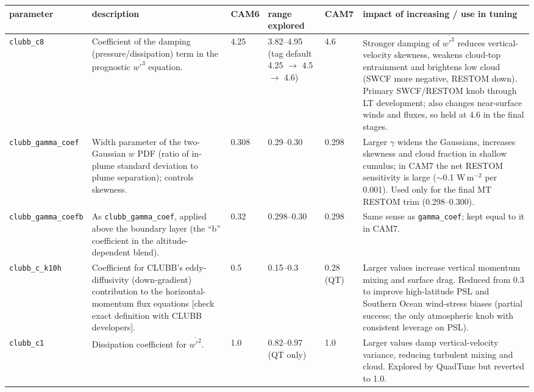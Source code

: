 \documentclass[draft]{agujournal2019}
\begin{document}
\scriptsize
 \begin{tabular}{p{2.3cm} p{3.1cm} p{0.9cm} p{1.8cm} p{1.0cm} p{4.2cm}}
  \hline
 parameter & description & CAM6 & range explored & CAM7 & impact of increasing / use in tuning \\
 \hline  \hline
\texttt{clubb\_\allowbreak c8} &
Coefficient of the damping (pressure/dissipation) term in the prognostic
$\overline{w'^3}$ equation. &
4.25 & 3.82--4.95 (tag default 4.25 $\to$ 4.5 $\to$ 4.6) & 4.6 &
Stronger damping of $\overline{w'^3}$ reduces vertical-velocity skewness,
weakens cloud-top entrainment and brightens low cloud (SWCF more negative,
RESTOM down). Primary SWCF/RESTOM knob through LT development; also changes
near-surface winds and fluxes, so held at 4.6 in the final stages. \\

\texttt{clubb\_\allowbreak gamma\_\allowbreak coef} &
Width parameter of the two-Gaussian $w$ PDF (ratio of in-plume standard
deviation to plume separation); controls skewness. &
0.308 & 0.29--0.30 & 0.298 &
Larger $\gamma$ widens the Gaussians, increases skewness and cloud fraction in
shallow cumulus; in CAM7 the net RESTOM sensitivity is large
($\sim$0.1 W\,m$^{-2}$ per 0.001). Used only for the final MT RESTOM trim
(0.298--0.300). \\

\texttt{clubb\_\allowbreak gamma\_\allowbreak coefb} &
As \texttt{clubb\_gamma\_coef}, applied above the boundary layer (the ``b''
coefficient in the altitude-dependent blend). &
0.32 & 0.298--0.30 & 0.298 &
Same sense as \texttt{gamma\_coef}; kept equal to it in CAM7. \\

\texttt{clubb\_\allowbreak c\_\allowbreak k10h} &
Coefficient for CLUBB's eddy-diffusivity (down-gradient) contribution to the
horizontal-momentum flux equations [check exact definition with CLUBB
developers]. &
0.5 & 0.15--0.3 & 0.28 (QT) &
Larger values increase vertical momentum mixing and surface drag. Reduced from
0.3 to improve high-latitude PSL and Southern Ocean wind-stress biases
(partial success; the only atmospheric knob with consistent leverage on PSL). \\

\texttt{clubb\_\allowbreak c1} &
Dissipation coefficient for $\overline{w'^2}$. &
1.0 & 0.82--0.97 (QT only) & 1.0 &
Larger values damp vertical-velocity variance, reducing turbulent mixing and
cloud. Explored by QuadTune but reverted to 1.0. \\


\end{tabular}
\end{document}

